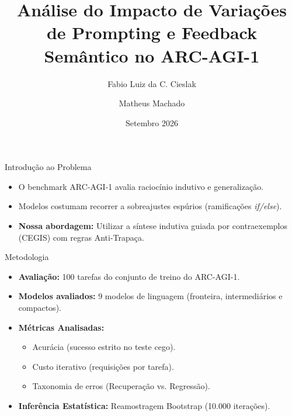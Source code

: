 \documentclass{beamer}
\title[ARC-AGI-1 e CEGIS]{Análise do Impacto de Variações de Prompting e Feedback Semântico no ARC-AGI-1}
\author[Cieslak, Machado]{Fabio Luiz da C. Cieslak \and Matheus Machado}
\institute[UFRGS]{Universidade Federal do Rio Grande do Sul}
\date{Setembro 2026}
\begin{document}
\begin{frame}
    \titlepage
\end{frame}

\begin{frame}{Introdução ao Problema}
    \begin{itemize}
        \item O benchmark ARC-AGI-1 avalia raciocínio indutivo e generalização.
        \item Modelos costumam recorrer a sobreajustes espúrios (ramificações \textit{if/else}).
        \item \textbf{Nossa abordagem:} Utilizar a síntese indutiva guiada por contraexemplos (CEGIS) com regras Anti-Trapaça.
    \end{itemize}
\end{frame}
\begin{frame}{Metodologia}
    \begin{itemize}
        \item \textbf{Avaliação:} 100 tarefas do conjunto de treino do ARC-AGI-1.
        \item \textbf{Modelos avaliados:} 9 modelos de linguagem (fronteira, intermediários e compactos).
        \item \textbf{Métricas Analisadas:}
        \begin{itemize}
            \item Acurácia (sucesso estrito no teste cego).
            \item Custo iterativo (requisições por tarefa).
            \item Taxonomia de erros (Recuperação vs. Regressão).
        \end{itemize}
        \item \textbf{Inferência Estatística:} Reamostragem Bootstrap (10.000 iterações).
    \end{itemize}
\end{frame}
\end{document}
